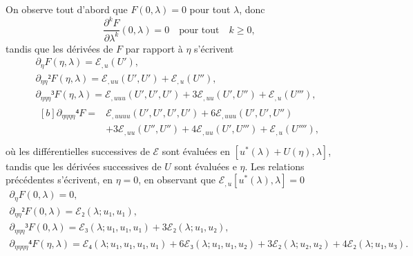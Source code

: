 \documentclass[12pt, final]{scrartcl}
\theoremstyle{definition}
\begin{document}
On observe tout d'abord que \(F(0, λ) = 0\) pour tout \(λ\), donc
\begin{equation*}
  \frac{∂^k F}{∂ λ^k}(0, λ) = 0 \quad \text{pour tout} \quad k ≥ 0,
\end{equation*}
tandis que les dérivées de \(F\) par rapport à \(η\) s'écrivent
\begin{gather*}
  ∂_{η} F(η, λ) = ℰ_{, u}(U'),\\
  ∂_{ηη}² F(η, λ) = ℰ_{, uu} (U', U') + ℰ_{, u} (U''),\\
  ∂_{ηηη}³ F(η, λ) = ℰ_{, uuu}(U', U', U') + 3ℰ_{, uu}(U', U'') + ℰ_{, u}(U'''),\\
  \begin{aligned}[b]
    ∂_{ηηηη}⁴ F ={}
    & ℰ_{, uuuu}(U', U', U', U') + 6ℰ_{,uuu}(U', U', U'')\\
    & + 3ℰ_{, uu}(U'', U'') + 4ℰ_{, uu}(U', U''') + ℰ_{, u}(U''''),
  \end{aligned}\\
\end{gather*}
où les différentielles successives de \(ℰ\) sont évaluées en
\([u^{\ast}(λ) + U(η), λ]\), tandis que les dérivées successives de \(U\) sont
évaluées e \(η\).  Les relations précédentes s'écrivent, en \(η = 0\), en
observant que \(ℰ_{, u}[u^{\ast}(λ), λ] = 0\)
\begin{gather*}
  ∂_{η} F(0, λ) = 0,\\
  ∂_{ηη}² F(0, λ) =ℰ₂(λ ; u₁, u₁),\\
  ∂_{ηηη}³ F(0, λ) = ℰ₃(λ; u₁, u₁, u₁) + 3ℰ₂(λ; u₁, u₂),\\
  ∂_{ηηηη}⁴ F(η, λ) = ℰ₄(λ; u₁, u₁, u₁, u₁) + 6ℰ₃(λ; u₁, u₁, u₂) + 3ℰ₂(λ; u₂, u₂) + 4ℰ₂(λ; u₁, u₃).
\end{gather*}
\end{document}
